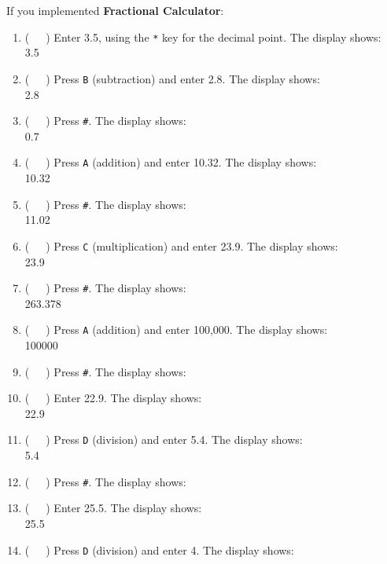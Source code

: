 If you implemented \textbf{Fractional Calculator}:

\begin{enumerate}[resume]
\item (\ \ \ ) Enter 3.5, using the \texttt{*} key for the decimal point. The
    display shows: \\
    {\dviiseg \phantom{888888}3.5}
\item (\ \ \ ) Press \texttt{B} (subtraction) and enter 2.8. The display shows: \\
    {\dviiseg \phantom{888888}2.8}
\item (\ \ \ ) Press \texttt{\#}. The display shows: \\
    {\dviiseg \phantom{888888}0.7}
\item (\ \ \ ) Press \texttt{A} (addition) and enter 10.32. The display shows: \\
    {\dviiseg \phantom{8888}10.32}
\item (\ \ \ ) Press \texttt{\#}. The display shows: \\
    {\dviiseg \phantom{8888}11.02}
\item (\ \ \ ) Press \texttt{C} (multiplication) and enter 23.9. The display shows: \\
    {\dviiseg \phantom{88888}23.9}
\item (\ \ \ ) Press \texttt{\#}. The display shows: \\
    {\dviiseg \phantom{88}263.378}
\item (\ \ \ ) Press \texttt{A} (addition) and enter 100,000. The display
    shows: \\
    {\dviiseg \phantom{88}100000}
\item (\ \ \ ) Press \texttt{\#}. The display shows: \\
    {}
\item (\ \ \ ) Enter 22.9. The display shows: \\
    {\dviiseg \phantom{88888}22.9}
\item (\ \ \ ) Press \texttt{D} (division) and enter 5.4. The display shows: \\
    {\dviiseg \phantom{888888}5.4}
\item (\ \ \ ) Press \texttt{\#}. The display shows: \\
    {}
\item (\ \ \ ) Enter 25.5. The display shows: \\
    {\dviiseg \phantom{88888}25.5}
\item (\ \ \ ) Press \texttt{D} (division) and enter 4. The display shows: \\

\end{enumerate}
